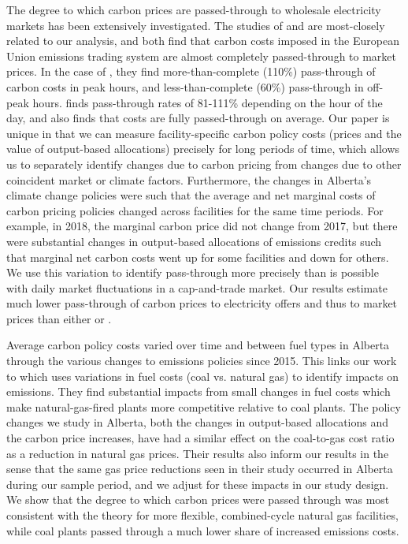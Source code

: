 \documentclass[12pt]{article}
\begin{document}
The degree to which carbon prices are passed-through to wholesale electricity markets has been extensively investigated. The studies of \cite{fabra_reguant} and \cite{hintermann16_germany} are most-closely related to our analysis, and both find that carbon costs imposed in the European Union emissions trading system are almost completely passed-through to market prices. In the case of \citeauthor{fabra_reguant}, they find more-than-complete (110\%) pass-through of carbon costs in peak hours, and less-than-complete (60\%) pass-through in off-peak hours. \citeauthor{hintermann16_germany} finds pass-through rates of 81-111\% depending on the hour of the day, and also finds that costs are fully passed-through on average. Our paper is unique in that we can measure facility-specific carbon policy costs (prices and the value of output-based allocations) precisely for long periods of time, which allows us to separately identify changes due to carbon pricing from changes due to other coincident market or climate factors. Furthermore, the changes in Alberta's climate change policies were such that the average and net marginal costs of carbon pricing policies changed across facilities for the same time periods. For example, in 2018, the marginal carbon price did not change from 2017, but there were substantial changes in output-based allocations of emissions credits such that marginal net carbon costs went up for some facilities and down for others. We use this variation to identify pass-through more precisely than is possible with daily market fluctuations in a cap-and-trade market. Our results estimate much lower pass-through of carbon prices to electricity offers and thus to market prices than either \cite{fabra_reguant} or \cite{hintermann16_germany}.

Average carbon policy costs varied over time and between fuel types in Alberta through the various changes to emissions policies since 2015. This links our work to \cite{cullen_mansur} which uses variations in fuel costs (coal vs. natural gas) to identify impacts on emissions. They find substantial impacts from small changes in fuel costs which make natural-gas-fired plants more competitive relative to coal plants. The policy changes we study in Alberta, both the changes in output-based allocations and the carbon price increases, have had a similar effect on the coal-to-gas cost ratio as a reduction in natural gas prices. Their results also inform our results in the sense that the same gas price reductions seen in their study occurred in Alberta during our sample period, and we adjust for these impacts in our study design. We show that the degree to which carbon prices were passed through was most consistent with the theory for more flexible, combined-cycle natural gas facilities, while coal plants passed through a much lower share of increased emissions costs.
\end{document}
